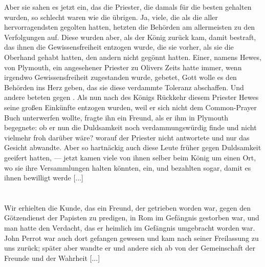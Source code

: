 Aber sie sahen es jetzt ein,
das die Priester, die damals für die besten gehalten wurden, so
schlecht waren wie die übrigen. Ja, viele, die als die aller 
hervorragendsten gegolten hatten, hetzten die Behörden am 
allermeisten zu den Verfolgungen auf. Diese wurden aber, als der
König zurück kam, damit bestraft, das ihnen die Gewissensfreiheit
entzogen wurde, die sie vorher, als sie die Oberhand gehabt hatten,
den andern nicht gegönnt hatten. Einer, namens Hewes, von
Plymouth, ein angesehener Priester 
zu Olivers Zeits hatte immer,
wenn irgendwo Gewissensfreiheit zugestanden wurde, gebetet, Gott
wolle es den Behörden ins Herz geben, das sie diese verdammte
Toleranz abschaffen.   
Und andere beteten gegen . Als nun nach des Königs Rückkehr
diesem Priester Hewes seine großen Einkünfte entzogen wurden,
weil er sich nicht dem Common-Prayer Buch unterwerfen wollte,
fragte ihn ein Freund, als er ihm in Plymouth begegnete: ob er
nun die Duldsamkeit noch verdammungswürdig finde und nicht
vielmehr froh darüber wäre? worauf der Priester nicht antwortete
und nur das Gesicht abwandte. Aber so hartnäckig auch diese
Leute früher gegen Duldsamkeit geeifert hatten, — jetzt kamen
viele von ihnen selber beim König um einen Ort, wo sie ihre
Versammlungen halten könnten, ein, und bezahlten sogar, damit
es ihnen bewilligt werde [...]

\section{}

Wir erhielten die Kunde, das ein Freund, der getrieben worden
war, gegen den Götzendienst der Papisten 
zu predigen, in Rom
im Gefängnis gestorben war, und man hatte den Verdacht, das
er heimlich im Gefängnis umgebracht worden war. John Perrot 
war auch dort gefangen gewesen und kam nach seiner Freilassung
zu uns zurück; später aber wandte er und andere sich ab von
der Gemeinschaft der Freunde und der Wahrheit [...]

